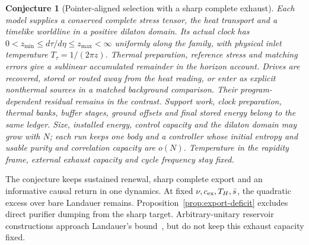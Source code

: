 \documentclass[12pt,a4paper]{article}
\newtheorem{conjecture}[theorem]{Conjecture}
\begin{document}
\begin{conjecture}[Pointer-aligned selection with a sharp complete exhaust]
Each model supplies a conserved complete stress tensor, the heat transport
and a timelike worldline in a positive dilaton domain. Its actual clock
has $0<z_{\min}\le d\tau/d\eta\le z_{\max}<\infty$ uniformly along the
family, with physical inlet temperature $T_\tau=1/(2\pi z)$.
Thermal preparation, reference stress and matching errors give a
sublinear accumulated remainder in the horizon account. Drives are
recovered, stored or routed away from the heat reading, or enter as
explicit nonthermal sources in a matched background comparison. Their
program-dependent residual remains in the contrast. Support work,
clock preparation, thermal banks, buffer stages, ground offsets and
final stored energy belong to the same ledger. Size, installed energy,
control capacity and the dilaton domain may grow with $N$; each run
keeps one body and a controller whose initial entropy and usable purity
and correlation capacity are $o(N)$.
Temperature in the rapidity frame, external exhaust capacity and
cycle frequency stay fixed.
\end{conjecture}

The conjecture keeps sustained renewal, sharp complete export and an
informative causal return in one dynamics. At fixed
$\nu,c_{\rm ex},T_H,\bar s$, the quadratic excess over bare Landauer
remains. Proposition~\ref{prop:export-deficit} excludes direct purifier
dumping from the sharp target. Arbitrary-unitary reservoir constructions
approach Landauer's bound~\cite[Section~6]{ReebWolf2014}, but do not
keep this exhaust capacity fixed.
\end{document}

